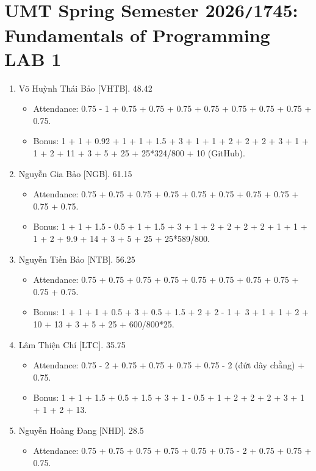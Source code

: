 \documentclass{article}
\begin{document}

\section{UMT Spring Semester 2026{\tt/}1745: Fundamentals of Programming LAB 1}

\begin{enumerate}
    \item {\sc Võ Huỳnh Thái Bảo [VHTB].} 48.42
    \begin{itemize}
        \item Attendance: 0.75 - 1 + 0.75 + 0.75 + 0.75 + 0.75 + 0.75 + 0.75 + 0.75 + 0.75.
        \item Bonus: 1 + 1 + 0.92 + 1 + 1 + 1.5 + 3 + 1 + 1 + 2 + 2 + 2 + 3 + 1 + 1 + 2 + 11 + 3 + 5 + 25 + 25*324/800 + 10 (GitHub).
    \end{itemize}
    \item {\sc Nguyễn Gia Bảo [NGB].} 61.15
    \begin{itemize}
        \item Attendance: 0.75 + 0.75 + 0.75 + 0.75 + 0.75 + 0.75 + 0.75 + 0.75 + 0.75 + 0.75.
        \item Bonus: 1 + 1 + 1.5 - 0.5 + 1 + 1.5 + 3 + 1 + 2 + 2 + 2 + 2 + 1 + 1 + 1 + 2 + 9.9 + 14 + 3 + 5 + 25 + 25*589/800.
    \end{itemize}
    \item {\sc Nguyễn Tiến Bảo [NTB].} 56.25
    \begin{itemize}
        \item Attendance: 0.75 + 0.75 + 0.75 + 0.75 + 0.75 + 0.75 + 0.75 + 0.75 + 0.75 + 0.75.
        \item Bonus: 1 + 1 + 1 + 0.5 + 3 + 0.5 + 1.5 + 2 + 2 - 1 + 3 + 1 + 1 + 2 + 10 + 13 + 3 + 5 + 25 + 600/800*25.
    \end{itemize}
    \item {\sc Lâm Thiện Chí [LTC].} 35.75
    \begin{itemize}
        \item Attendance: 0.75 - 2 + 0.75 + 0.75 + 0.75 + 0.75 - 2 (đứt dây chằng) + 0.75.
        \item Bonus: 1 + 1 + 1.5 + 0.5 + 1.5 + 3 + 1 - 0.5 + 1 + 2 + 2 + 2 + 3 + 1 + 1 + 2 + 13.
    \end{itemize}
    \item {\sc Nguyễn Hoàng Đang [NHD].} 28.5
    \begin{itemize}
        \item Attendance: 0.75 + 0.75 + 0.75 + 0.75 + 0.75 + 0.75 - 2 + 0.75 + 0.75 + 0.75.

\end{itemize}
\end{enumerate}
\end{document}
